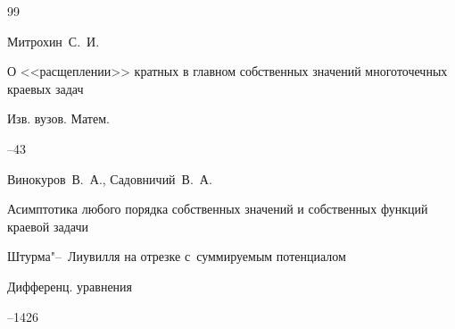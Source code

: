 \begin{thebibliography}{99}




\by Митрохин~С.~И.

\paper О <<расщеплении>> кратных в главном собственных значений многоточечных краевых задач

\jour Изв. вузов. Матем.



--43















\by Винокуров~В.~А., Садовничий~В.~А.

\paper Асимптотика любого порядка собственных значений и собственных функций краевой задачи 

Штурма"--~Лиувилля на отрезке с~суммируемым потенциалом

\jour Дифференц. уравнения




--1426















\end{thebibliography}
